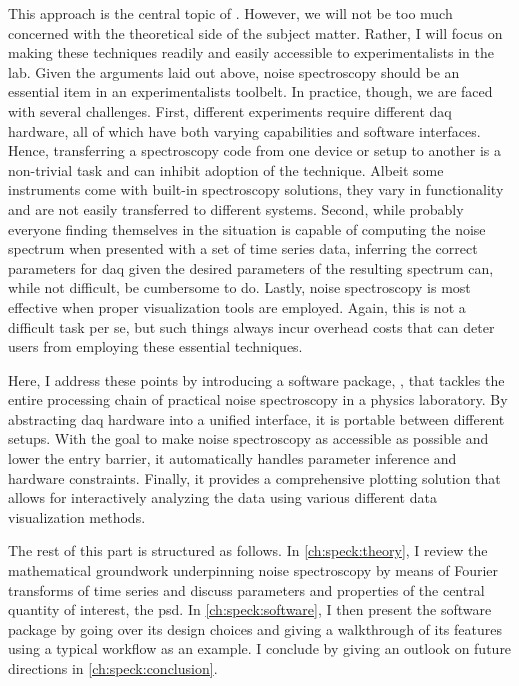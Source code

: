 This approach is the central topic of \thispart.
However, we will not be too much concerned with the theoretical side of the subject matter.
Rather, I will focus on making these techniques readily and easily accessible to experimentalists in the lab.
Given the arguments laid out above, noise spectroscopy should be an essential item in an experimentalists toolbelt.
In practice, though, we are faced with several challenges.
First, different experiments require different \gls{daq} hardware, all of which have both varying capabilities and software interfaces.
Hence, transferring a spectroscopy code from one device or setup to another is a non-trivial task and can inhibit adoption of the technique.
Albeit some instruments come with built-in spectroscopy solutions, they vary in functionality and are not easily transferred to different systems.
Second, while probably everyone finding themselves in the situation is capable of computing the noise spectrum when presented with a set of time series data, inferring the correct parameters for \acrlong{daq} given the desired parameters of the resulting spectrum can, while not difficult, be cumbersome to do.
Lastly, noise spectroscopy is most effective when proper visualization tools are employed.
Again, this is not a difficult task per se, but such things always incur overhead costs that can deter users from employing these essential techniques.

Here, I address these points by introducing a \python software package, \pyspeck, that tackles the entire processing chain of practical noise spectroscopy in a physics laboratory.
By abstracting \gls{daq} hardware into a unified interface, it is portable between different setups.
With the goal to make noise spectroscopy as accessible as possible and lower the entry barrier, it automatically handles parameter inference and hardware constraints.
Finally, it provides a comprehensive plotting solution that allows for interactively analyzing the data using various different data visualization methods.

The rest of this part is structured as follows.
In \cref{ch:speck:theory}, I review the mathematical groundwork underpinning noise spectroscopy by means of Fourier transforms of time series and discuss parameters and properties of the central quantity of interest, the \gls{psd}.
In \cref{ch:speck:software}, I then present the software package by going over its design choices and giving a walkthrough of its features using a typical workflow as an example.
I conclude by giving an outlook on future directions in \cref{ch:speck:conclusion}.
